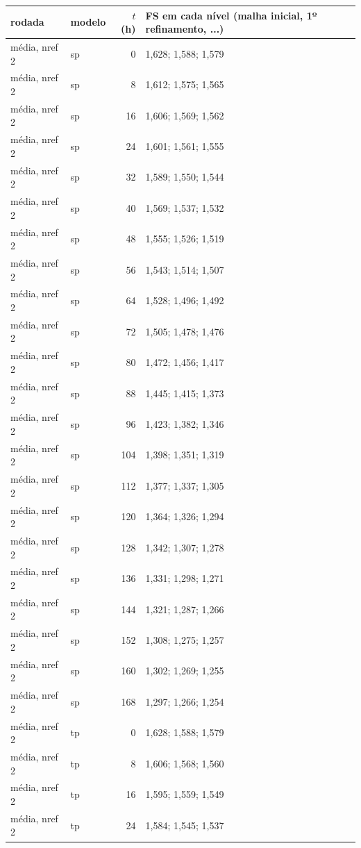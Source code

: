 \begin{tabular}{llr|l}
\toprule
rodada & modelo & $t$ (h) & FS em cada nível (malha inicial, 1º refinamento, ...)\\
\midrule
média, nref 2 & sp & 0 & 1{,}628; 1{,}588; 1{,}579\\
média, nref 2 & sp & 8 & 1{,}612; 1{,}575; 1{,}565\\
média, nref 2 & sp & 16 & 1{,}606; 1{,}569; 1{,}562\\
média, nref 2 & sp & 24 & 1{,}601; 1{,}561; 1{,}555\\
média, nref 2 & sp & 32 & 1{,}589; 1{,}550; 1{,}544\\
média, nref 2 & sp & 40 & 1{,}569; 1{,}537; 1{,}532\\
média, nref 2 & sp & 48 & 1{,}555; 1{,}526; 1{,}519\\
média, nref 2 & sp & 56 & 1{,}543; 1{,}514; 1{,}507\\
média, nref 2 & sp & 64 & 1{,}528; 1{,}496; 1{,}492\\
média, nref 2 & sp & 72 & 1{,}505; 1{,}478; 1{,}476\\
média, nref 2 & sp & 80 & 1{,}472; 1{,}456; 1{,}417\\
média, nref 2 & sp & 88 & 1{,}445; 1{,}415; 1{,}373\\
média, nref 2 & sp & 96 & 1{,}423; 1{,}382; 1{,}346\\
média, nref 2 & sp & 104 & 1{,}398; 1{,}351; 1{,}319\\
média, nref 2 & sp & 112 & 1{,}377; 1{,}337; 1{,}305\\
média, nref 2 & sp & 120 & 1{,}364; 1{,}326; 1{,}294\\
média, nref 2 & sp & 128 & 1{,}342; 1{,}307; 1{,}278\\
média, nref 2 & sp & 136 & 1{,}331; 1{,}298; 1{,}271\\
média, nref 2 & sp & 144 & 1{,}321; 1{,}287; 1{,}266\\
média, nref 2 & sp & 152 & 1{,}308; 1{,}275; 1{,}257\\
média, nref 2 & sp & 160 & 1{,}302; 1{,}269; 1{,}255\\
média, nref 2 & sp & 168 & 1{,}297; 1{,}266; 1{,}254\\
média, nref 2 & tp & 0 & 1{,}628; 1{,}588; 1{,}579\\
média, nref 2 & tp & 8 & 1{,}606; 1{,}568; 1{,}560\\
média, nref 2 & tp & 16 & 1{,}595; 1{,}559; 1{,}549\\
média, nref 2 & tp & 24 & 1{,}584; 1{,}545; 1{,}537\\

\end{tabular}
